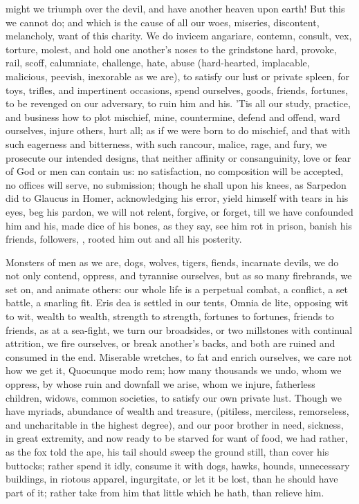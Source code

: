 {might we triumph over the devil, and have another heaven upon earth!
But this we cannot do; and which is the cause of all our woes,
miseries, discontent, melancholy, want of this charity. We do
invicem angariare, contemn, consult, vex, torture, molest, and hold one
another's noses to the grindstone hard, provoke, rail, scoff,
calumniate, challenge, hate, abuse (hard-hearted, implacable,
malicious, peevish, inexorable as we are), to satisfy our lust or
private spleen, for toys, trifles, and impertinent occasions,
spend ourselves, goods, friends, fortunes, to be revenged on our
adversary, to ruin him and his. 'Tis all our study, practice, and
business how to plot mischief, mine, countermine, defend and offend,
ward ourselves, injure others, hurt all; as if we were born to do
mischief, and that with such eagerness and bitterness, with such
rancour, malice, rage, and fury, we prosecute our intended designs,
that neither affinity or consanguinity, love or fear of God or men can
contain us: no satisfaction, no composition will be accepted, no
offices will serve, no submission; though he shall upon his knees, as
Sarpedon did to Glaucus in Homer, acknowledging his error, yield
himself with tears in his eyes, beg his pardon, we will not relent,
forgive, or forget, till we have confounded him and his, made dice of
his bones, as they say, see him rot in prison, banish his friends,
followers, , rooted him out and all his posterity.

Monsters of men as we are, dogs, wolves, tigers, fiends,
incarnate devils, we do not only contend, oppress, and tyrannise
ourselves, but as so many firebrands, we set on, and animate others:
our whole life is a perpetual combat, a conflict, a set battle, a
snarling fit. Eris dea is settled in our tents, Omnia de lite,
opposing wit to wit, wealth to wealth, strength to strength, fortunes
to fortunes, friends to friends, as at a sea-fight, we turn our
broadsides, or two millstones with continual attrition, we fire
ourselves, or break another's backs, and both are ruined and consumed
in the end. Miserable wretches, to fat and enrich ourselves, we care
not how we get it, Quocunque modo rem; how many thousands we undo, whom
we oppress, by whose ruin and downfall we arise, whom we injure,
fatherless children, widows, common societies, to satisfy our own
private lust. Though we have myriads, abundance of wealth and treasure,
(pitiless, merciless, remorseless, and uncharitable in the highest
degree), and our poor brother in need, sickness, in great extremity,
and now ready to be starved for want of food, we had rather, as the fox
told the ape, his tail should sweep the ground still, than cover his
buttocks; rather spend it idly, consume it with dogs, hawks, hounds,
unnecessary buildings, in riotous apparel, ingurgitate, or let it be
lost, than he should have part of it; rather take from him that
little which he hath, than relieve him.

}
